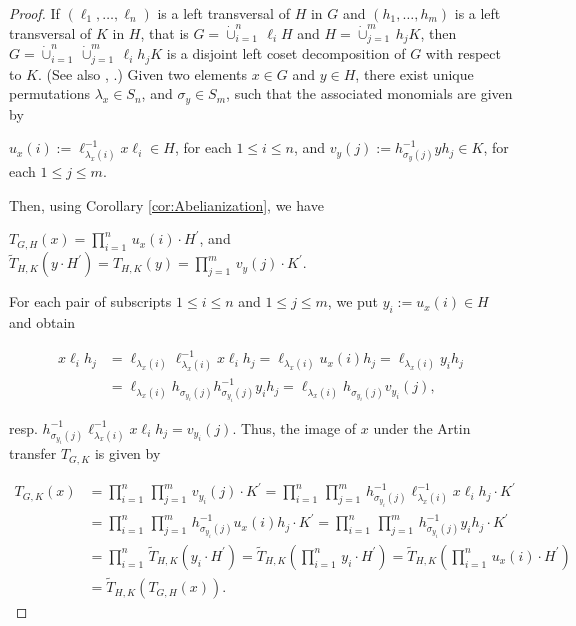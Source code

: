 \documentclass{amsart}
\theoremstyle{definition}
\numberwithin{equation}{section}
\begin{document}
\begin{proof}
If \((\ell_1,\ldots,\ell_n)\) is a left transversal of \(H\) in \(G\)
and \((h_1,\ldots,h_m)\) is a left transversal of \(K\) in \(H\),
that is \(G=\dot{\cup}_{i=1}^n\,\ell_iH\) and \(H=\dot{\cup}_{j=1}^m\,h_jK\),
then \(G=\dot{\cup}_{i=1}^n\,\dot{\cup}_{j=1}^m\,\ell_ih_jK\) is a
disjoint left coset decomposition of \(G\) with respect to \(K\).
(See also
\cite[Thm.1.5.3, p.12]{Hl},
\cite[Satz 2.6, p.6]{Hp}.)
Given two elements \(x\in G\) and \(y\in H\),
there exist unique permutations \(\lambda_x\in S_n\), and \(\sigma_y\in S_m\),
such that the associated monomials are given by

\begin{center}
\(u_x(i):=\ell_{\lambda_x(i)}^{-1}x\ell_i\in H\), for each \(1\le i\le n\), and
\(v_y(j):=h_{\sigma_y(j)}^{-1}yh_j\in K\), for each \(1\le j\le m\).
\end{center}

\noindent
Then, using Corollary
\ref{cor:Abelianization},
we have

\begin{center}
\(T_{G,H}(x)=\prod_{i=1}^n\,u_x(i)\cdot H^\prime\), \quad
and \quad \(\tilde{T}_{H,K}(y\cdot H^\prime)=T_{H,K}(y)=\prod_{j=1}^m\,v_y(j)\cdot K^\prime\).
\end{center}

\noindent
For each pair of subscripts \(1\le i\le n\) and \(1\le j\le m\), we put \(y_i:=u_x(i)\in H\) and obtain

\begin{align*}
x\ell_ih_j &= \ell_{\lambda_x(i)}\ell_{\lambda_x(i)}^{-1}x\ell_ih_j=\ell_{\lambda_x(i)}u_x(i)h_j
=\ell_{\lambda_x(i)}y_ih_j \\
        &= \ell_{\lambda_x(i)}h_{\sigma_{y_i}(j)}h_{\sigma_{y_i}(j)}^{-1}y_ih_j
=\ell_{\lambda_x(i)}h_{\sigma_{y_i}(j)}v_{y_i}(j),
\end{align*}

\noindent
resp. \(h_{\sigma_{y_i}(j)}^{-1}\ell_{\lambda_x(i)}^{-1}x\ell_ih_j=v_{y_i}(j)\).
Thus, the image of \(x\) under the Artin transfer \(T_{G,K}\) is given by

\begin{align*}
T_{G,K}(x) &= \prod_{i=1}^n\,\prod_{j=1}^m\,v_{y_i}(j)\cdot K^\prime
=\prod_{i=1}^n\,\prod_{j=1}^m\,h_{\sigma_{y_i}(j)}^{-1}\ell_{\lambda_x(i)}^{-1}x\ell_ih_j\cdot K^\prime \\
           &= \prod_{i=1}^n\,\prod_{j=1}^m\,h_{\sigma_{y_i}(j)}^{-1}u_x(i)h_j\cdot K^\prime
=\prod_{i=1}^n\,\prod_{j=1}^m\,h_{\sigma_{y_i}(j)}^{-1}y_ih_j\cdot K^\prime \\
           &= \prod_{i=1}^n\,\tilde{T}_{H,K}(y_i\cdot H^\prime)
=\tilde{T}_{H,K}(\prod_{i=1}^n\,y_i\cdot H^\prime)=\tilde{T}_{H,K}(\prod_{i=1}^n\,u_x(i)\cdot H^\prime) \\
           &= \tilde{T}_{H,K}(T_{G,H}(x)).
\end{align*}
\end{proof}
\end{document}
